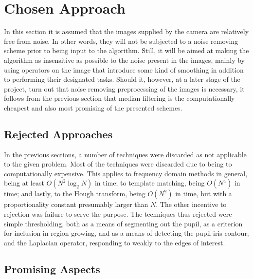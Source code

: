
\section{Chosen Approach}
\label{eval:approach}

In this section it is assumed that the images supplied by the camera
are relatively free from noise.  In other words, they will not be
subjected to a noise removing scheme prior to being input to the
algorithm.  Still, it will be aimed at making the algorithm as
insensitive as possible to the noise present in the images, mainly by
using operators on the image that introduce some kind of smoothing in
addition to performing their designated tasks.  Should it, however, at
a later stage of the project, turn out that noise removing
preprocessing of the images is necessary, it follows from the previous
section that median filtering is the computationally cheapest and also
most promising of the presented schemes.

\subsection{Rejected Approaches}
\label{eval:approach:reject}

In the previous sections, a number of techniques were discarded as
not applicable to the given problem.  Most of the techniques were
discarded due to being to computationally expensive.  This applies to
frequency domain methods in general, being at least
$O(N^{2}\log_{2}N)$ in time; to template matching, being $O(N^{4})$ in
time; and lastly, to the Hough transform, being $O(N^{2})$ in time,
but with a proportionality constant presumably larger than $N$.  The
other incentive to rejection was failure to serve the purpose.  The
techniques thus rejected were simple thresholding, both as a means of
segmenting out the pupil, as a criterion for inclusion in region
growing, and as a means of detecting the pupil-iris contour; and the
Laplacian operator, responding to weakly to the edges of interest.

\subsection{Promising Aspects}
\label{eval:approach:aspect}

